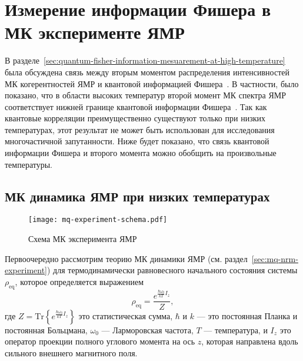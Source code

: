 \chapter{Измерение информации Фишера в МК эксперименте ЯМР}
\label{chapter:quantum-fisher-information-measurement}

В разделе~\ref{sec:quantum-fisher-information-mesuarement-at-high-temperature}
была обсуждена связь между вторым моментом распределения интенсивностей МК когерентностей ЯМР и квантовой информацией Фишера~\cite{Toth2014,Pezze2018}.
В частности, было показано,
что в области высоких температур второй момент МК спектра ЯМР соответствует нижней границе квантовой информации Фишера~\cite{Garttner2018}.
Так как квантовые корреляции преимущественно существуют только при низких температурах,
этот результат не может быть использован для исследования многочастичной запутанности.
Ниже будет показано, что связь квантовой информации Фишера и второго момента можно обобщить на произвольные температуры.


\section{МК динамика ЯМР при низких температурах}
\begin{figure}[H]
  \centering
  \texttt{[image: mq-experiment-schema.pdf]}
  \caption{Схема МК эксперимента ЯМР}
  \label{fig:mq-experiment-schema}
\end{figure}

Первоочередно рассмотрим теорию МК динамики ЯМР (см. раздел~\ref{sec:mq-nrm-experiment})
для термодинамически равновесного начального состояния системы $\rho_\mathrm{eq}$,
которое определяется выражением
%
\begin{equation}
  \label{eq:rho_eq}
  \rho_{\mathrm{eq}} = \dfrac{e^{\frac{\hbar\omega_{0}}{kT} I_z}}{Z},
\end{equation}
%
где $Z =\mathrm{Tr}\left\{e^{\frac{\hbar\omega_{0}}{kT} I_z}\right\}$ это статистическая сумма,
$\hbar$ и $k$ --- это постоянная Планка и постоянная Больцмана,
$\omega_0$ --- Ларморовская частота,
$T$ --- температура,
и $I_z$ это оператор проекции полного углового момента на ось $z$,
которая направлена вдоль сильного внешнего магнитного поля.

